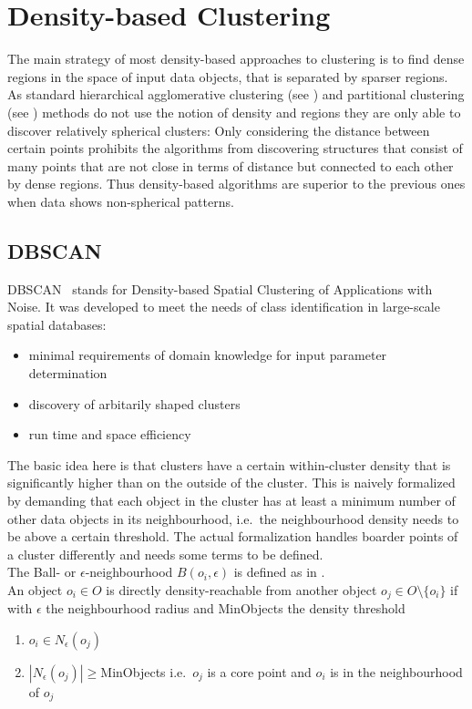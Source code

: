 \section{Density-based Clustering}
The main strategy of most density-based approaches to clustering is to find dense regions in the space of input data objects, that is separated by sparser regions. As standard hierarchical agglomerative clustering (see ) and partitional clustering (see ) methods do not use the notion of density and regions they are only able to discover relatively spherical clusters: Only considering the distance between certain points prohibits the algorithms from discovering structures that consist of many points that are not close in terms of distance but connected to each other by dense regions. Thus density-based algorithms are superior to the previous ones when data shows non-spherical patterns. \\

\subsection{DBSCAN}\label{\positionnumber}
DBSCAN~\cite{dbscan} stands for Density-based Spatial Clustering of Applications with Noise. It was developed to meet the needs of class identification in large-scale spatial databases:
\begin{itemize}
    \item minimal requirements of domain knowledge for input parameter determination
    \item discovery of arbitarily shaped clusters
    \item run time and space efficiency
\end{itemize}
The basic idea here is that clusters have a certain within-cluster density that is significantly higher than on the outside of the cluster. This is naively formalized by demanding that each object in the cluster has at least a minimum number of other data objects in its neighbourhood, i.e.~the neighbourhood density needs to be above a certain threshold. The actual formalization handles boarder points of a cluster differently and needs some terms to be defined. \\

\noindent The Ball- or $\epsilon$-neighbourhood $B(o_i, \epsilon)$ is defined as in . \\

\noindent An object $o_i \in O$ is directly density-reachable from another object $o_j \in O\setminus \{o_i\}$ if with $\epsilon$ the neighbourhood radius and MinObjects the density threshold
\begin{enumerate}
    \item $o_i \in N_\epsilon (o_j)$
    \item $|N_\epsilon(o_j)| \geq $MinObjects i.e.~$o_j$ is a core point and $o_i$ is in the neighbourhood of $o_j$
\end{enumerate}

